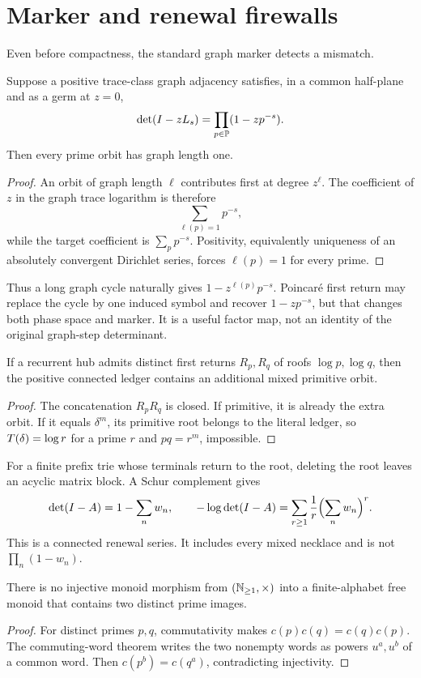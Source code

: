 \section{Marker and renewal firewalls}

Even before compactness, the standard graph marker detects a mismatch.

\begin{corollary}\label{cor:marker}
Suppose a positive trace-class graph adjacency satisfies, in a common
half-plane and as a germ at $z=0$,
\[
  \det(I-zL_s)=\prod_{p\in\mathbb P}(1-zp^{-s}).
\]
Then every prime orbit has graph length one.
\end{corollary}

\begin{proof}
An orbit of graph length $\ell$ contributes first at degree $z^\ell$.
The coefficient of $z$ in the graph trace logarithm is therefore
\[
  \sum_{\ell(p)=1}p^{-s},
\]
while the target coefficient is $\sum_pp^{-s}$.  Positivity, equivalently
uniqueness of an absolutely convergent Dirichlet series, forces
$\ell(p)=1$ for every prime.
\end{proof}

Thus a long graph cycle naturally gives $1-z^{\ell(p)}p^{-s}$.  Poincaré
first return may replace the cycle by one induced symbol and recover
$1-zp^{-s}$, but that changes both phase space and marker.  It is a useful
factor map, not an identity of the original graph-step determinant.

\begin{proposition}\label{prop:renewal}
If a recurrent hub admits distinct first returns $R_p,R_q$ of roofs
$\log p,\log q$, then the positive connected ledger contains an additional
mixed primitive orbit.
\end{proposition}

\begin{proof}
The concatenation $R_pR_q$ is closed.  If primitive, it is already the
extra orbit.  If it equals $\delta^m$, its primitive root belongs to the
literal ledger, so $T(\delta)=\log r$ for a prime $r$ and
$pq=r^m$, impossible.
\end{proof}

For a finite prefix trie whose terminals return to the root, deleting the
root leaves an acyclic matrix block.  A Schur complement gives
\[
  \det(I-A)=1-\sum_n w_n,
  \qquad
  -\log\det(I-A)=\sum_{r\ge1}\frac1r\Bigl(\sum_nw_n\Bigr)^r.
\]
This is a connected renewal series.  It includes every mixed necklace and
is not $\prod_n(1-w_n)$.

\begin{proposition}
There is no injective monoid morphism from
$(\mathbb N_{\ge1},\times)$ into a finite-alphabet free monoid that contains two
distinct prime images.
\end{proposition}

\begin{proof}
For distinct primes $p,q$, commutativity makes $c(p)c(q)=c(q)c(p)$.
The commuting-word theorem writes the two nonempty words as powers
$u^a,u^b$ of a common word.  Then $c(p^b)=c(q^a)$, contradicting
injectivity.
\end{proof}


